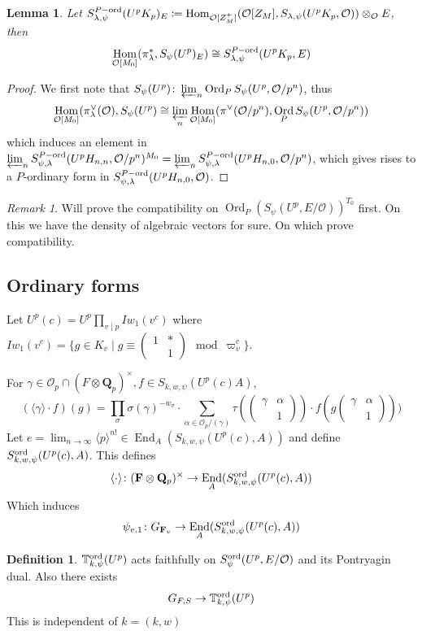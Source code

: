 \documentclass[leqno]{amsart}
\newcommand{\smat}[1]{\left( \begin{smallmatrix} #1 \end{smallmatrix} \right)}
\newcommand{\TT}{\mathbb{T}} %
\DeclareMathOperator{\Ord}{Ord}
\newcommand{\ord}{\textnormal{ord}}
\newcommand{\Qp}{\mathbf{Q}_p}
\newcommand{\F}{{\mathbf{F}}} %
\newcommand{\oo}{\mathcal{O}} %
\DeclareMathOperator{\End}{End}
\DeclareMathOperator{\Hom}{Hom}
\newtheorem{lem}[thm]{Lemma}
\theoremstyle{definition}
\newtheorem{defn}[thm]{Definition}
\theoremstyle{remark}
\newtheorem{rem}[thm]{Remark}
\begin{document}
\begin{lem}
	Let $S_{\lambda,\psi}^{P-\ord}(U^pK_p)_E
	\coloneqq \Hom_{\oo[Z_M^+]}
	(\oo[Z_M], S_{\lambda,\psi}(U^pK_p,\oo))\otimes_\oo E$,
	then
	\[
		\Hom_{\oo[M_0]}(\pi_\lambda^*, S_\psi(U^p)_E)\cong
		S_{\lambda,\psi}^{P-\ord}(U^pK_p,E)
	\]
\end{lem}
\begin{proof}
	We first note that 
	$S_\psi(U^p)\colon \varprojlim_{n}\Ord_PS_\psi(U^p, \oo/p^n)$,
	thus 
	\[
		\Hom_{\oo[M_0]}(\pi_\lambda^\vee(\oo),S_\psi(U^p)\cong
		\varprojlim_{n}\Hom_{\oo[M_0]}(\pi^\vee(\oo/p^n),
		\Ord_PS_\psi(U^p,\oo/p^n))
	\]
	which induces an element in 
	$\varprojlim_n S_{\psi,\lambda}^{P-\ord}(U^pH_{n,n},\oo/p^n)^{M_0}
	=\varprojlim_n S_{\psi,\lambda}^{P-\ord}(U^pH_{n,0},\oo/p^n)$,
	which gives rises to a $P$-ordinary form in 
	$S_{\psi,\lambda}^{P-\ord}(U^pH_{n,0},\oo)$.
\end{proof}


\begin{rem}
	Will prove the compatibility on 
	$\Ord_P(S_\psi(U^p,E/\oo))^{T_0}$ first.
	On this we have the density of 
	algebraic vectors for sure.
	On which prove compatibility. 
\end{rem}



\subsection{Ordinary forms}

Let $U^p(c)=U^p\prod_{v\mid p}Iw_1(v^c)$
where $Iw_1(v^c)=\{g\in K_v\mid g\equiv \smat{1&*\\&1}\mod \varpi_v^c\}$.

For $\gamma\in \oo_p\cap (F\otimes\Qp)^\times, f\in S_{k,w,\psi}(U^p(c) A)$,
\[
	(\langle\gamma\rangle\cdot f)(g)=
	\prod_{\sigma}\sigma(\gamma)^{-w_\sigma}\cdot
	\sum_{\alpha\in \oo_p/(\gamma)}
	\tau(\smat{\gamma&\alpha\\&1})\cdot
	f(g\smat{\gamma&\alpha\\&1}))
\]
Let $e=\lim_{n\to \infty}\langle p\rangle^{n!}\in \End_A(S_{k,w,\psi}(U^p(c),A))$
and define $S_{k,w,\psi}^{\ord}(U^p(c),A)$. This defines
\[
	\langle\cdot\rangle\colon (\F\otimes\Qp)^\times
	\to \End_A(S_{k,w,\psi}^{\ord}(U^p(c),A))
\]
Which induces  
\[
	\psi_{v,1}\colon G_{\F_v}
	\to \End_A(S_{k,w,\psi}^{\ord}(U^p(c),A))
\]
\begin{defn}
	$\TT_{k, \psi}^{\ord}(U^p)$ 
	acts faithfully on 
	$S_\psi^{\ord}(U^p,E/\oo)$ 
	and its Pontryagin dual.
	Also there exists 
	\[
		G_{F,S}\to \TT_{k, \psi}^{\ord}(U^p)
	\]
	This is independent of $k=(k,w)$
\end{defn}
\end{document}
